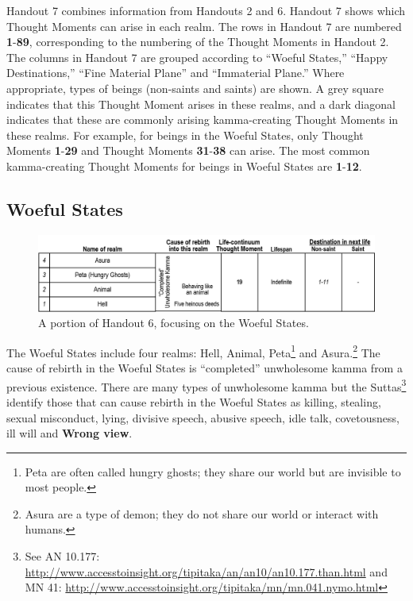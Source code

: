 Handout 7 combines information from Handouts 2 and 6. Handout 7 shows which Thought Moments can arise in each realm. The rows in Handout 7 are numbered \textbf{1}-\textbf{89}, corresponding to the numbering of the Thought Moments in Handout 2. The columns in Handout 7 are grouped according to “Woeful States,” “Happy Destinations,” “Fine Material Plane” and “Immaterial Plane.” Where appropriate, types of beings (non-saints and saints) are shown. A grey square indicates that this Thought Moment arises in these realms, and a dark diagonal indicates that these are commonly arising kamma-creating Thought Moments in these realms. For example, for beings in the Woeful States, only Thought Moments \textbf{1}-\textbf{29} and Thought Moments \textbf{31}-\textbf{38} can arise. The most common kamma-creating Thought Moments for beings in Woeful States are \textbf{1}-\textbf{12}.

\pagebreak

\subsection*{Woeful States}

\begin{figure}[h]
\centering
\includegraphics[width=0.9\linewidth]{./Diagrams/Woeful1}
\caption{A portion of Handout 6, focusing on the Woeful States.}
\label{fig:Woeful1}
\end{figure}

The Woeful States include four realms: Hell, Animal, Peta\footnote{Peta are often called hungry ghosts; they share our world but are invisible to most people.} and Asura.\footnote{Asura are a type of demon; they do not share our world or interact with humans.} The cause of rebirth in the Woeful States is “completed” unwholesome kamma from a previous existence. There are many types of unwholesome kamma but the Suttas\footnote{See AN 10.177: \url{http://www.accesstoinsight.org/tipitaka/an/an10/an10.177.than.html} and MN 41: \url{http://www.accesstoinsight.org/tipitaka/mn/mn.041.nymo.html}} identify those that can cause rebirth in the Woeful States as killing, stealing, sexual misconduct, lying, divisive speech, abusive speech, idle talk, covetousness, ill will and \textbf{Wrong view}.

